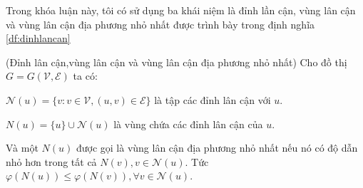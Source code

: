 Trong khóa luận này, tôi có sử dụng ba khái niệm là đỉnh lần cận, vùng lân cận và vùng lân cận địa phương nhỏ nhất được trình bày trong định nghĩa \ref{df:dinhlancan}
\begin{definition}(Đỉnh lân cận,vùng lân cận và vùng lân cận địa phương nhỏ nhất)\label{df:dinhlancan}
	Cho đồ thị $G = G(\mathcal{V},\mathcal{E})$ ta có:
	
	$\mathcal{N}(u) = \{v : v \in \mathcal{V}, (u,v) \in \mathcal{E}\}$ là tập các đỉnh lân cận với $u$.
	
	$N(u) = \{u\} \cup \mathcal{N}(u)$ là vùng chứa các đỉnh lân cận của $u$. 
	
	Và một $N(u)$ được gọi là vùng lân cận địa phương nhỏ nhất nếu nó có độ dẫn nhỏ hơn trong tất cả $N(v), v \in \mathcal{N}(u)$. Tức $\varphi(N(u)) \leq \varphi(N(v)), \forall v \in \mathcal{N}(u)$.
\end{definition}

